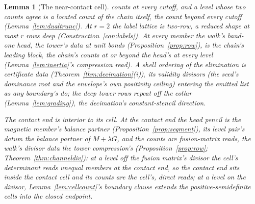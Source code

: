 \documentclass[11pt]{article}
\newtheorem{lemma}{Lemma}
\theoremstyle{definition}
\begin{document}
\begin{lemma}[The near-contact cell]
counts at every cutoff, and a
level whose two counts agree is a located count of the chain
itself, the count beyond every cutoff
(Lemma~\ref{lem:dualtrunc}). At $r=2$ the
label lattice is two-row, a reduced shape at most $r$ rows deep
(Construction~\ref{con:labels}). At every member the walk's band-one
head, the tower's data at unit bonds (Proposition~\ref{prop:row}),
is the chain's leading block, the chain's
counts at or beyond the head's at every level (Lemma~\ref{lem:inertia}'s
compression read). A shell ordering of the
elimination is certificate data (Theorem~\ref{thm:decimation}(i)), its
validity divisors (the seed's dominance root and the envelope's own
positivity ceiling) entering the emitted list as any boundary's do;
the deep tower rows repeat off the collar (Lemma~\ref{lem:grading}),
the decimation's constant-stencil direction.

\emph{The contact end is interior to its cell.} At the contact end the head pencil
is the magnetic member's balance partner
(Proposition~\ref{prop:segment}), its level pair's datum the
balance partner of $M+\lambda G$, and the counts are fusion-matrix reads, the walk's
divisor data the tower compression's (Proposition~\ref{prop:row};
Theorem~\ref{thm:channeldiv}): at a
level off the fusion matrix's divisor the cell's determinant reads unequal members at
the contact end, so the contact end sits inside the contact cell and its counts are the cell's, direct
reads; at a level on the divisor, Lemma~\ref{lem:cellcount}'s boundary
clause extends the positive-semidefinite cells into the closed
endpoint.

\end{lemma}
\end{document}
